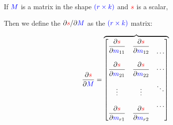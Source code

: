         
        \begin{definition}
            If $\textcolor{blue}{M}$ is a matrix in the shape $\textcolor{blue}{ (r \times k) }$ and $\textcolor{red}{s}$ is a scalar,
            
            Then we define the  ${\partial  \textcolor{red}{s} }/{\partial  \textcolor{blue}{M} }$ as the $\textcolor{blue}{ (r \times k) }$ matrix:
            
            \begin{equation*}
                \pderiv{ \red{s} }{ \blu{M} }
                =
                \overbrace{
                    \begin{bmatrix}
                        \begin{matrix}
                            \bigpderiv{ \red{s} } { \blu{m}_{11} }\\ 
                            \\
                            \bigpderiv{ \red{s} } { \blu{m}_{21} }\\ 
                            \\
                            \vdots \\ 
                            \\
                            \bigpderiv{ \red{s} } { \blu{m}_{r1} }
                        \end{matrix} 
                        &
                        \begin{matrix}
                            \bigpderiv{ \red{s} } { \blu{m}_{12} }\\ 
                            \\
                            \bigpderiv{ \red{s} } { \blu{m}_{22} }\\ 
                            \\
                            \vdots \\ 
                            \\
                            \bigpderiv{ \red{s} } { \blu{m}_{r2} }
                        \end{matrix}
                        &
                        \begin{matrix}
                            \cdots\\\\ \cdots \\\\ \ddots \\\\ \cdots
                        \end{matrix} 

\end{bmatrix}}
\end{equation*}
\end{definition}
